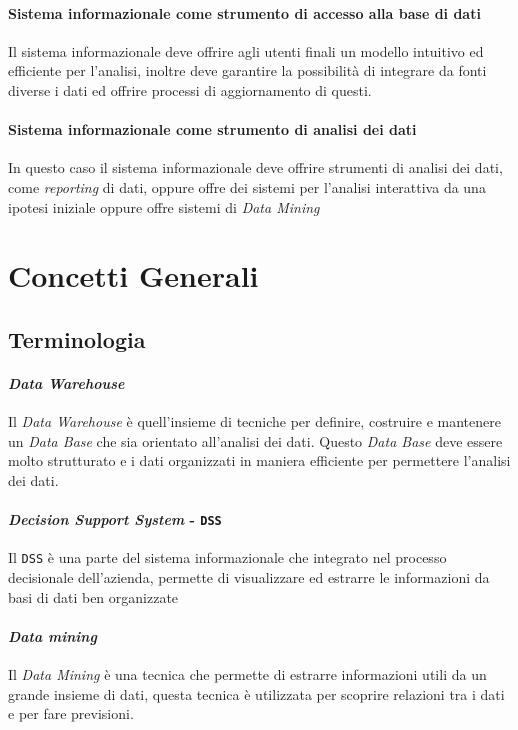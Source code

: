     \paragraph{Sistema informazionale come strumento di accesso alla base di dati} Il sistema informazionale deve offrire agli utenti finali un modello intuitivo ed efficiente per l'analisi, inoltre deve garantire la possibilità di integrare da fonti diverse i dati ed offrire processi di aggiornamento di questi.
    \paragraph{Sistema informazionale come strumento di analisi dei dati} In questo caso il sistema informazionale deve offrire strumenti di analisi dei dati, come \textit{reporting} di dati, oppure offre dei sistemi per l'analisi interattiva da una ipotesi iniziale oppure offre sistemi di \textit{Data Mining}
\section{Concetti Generali}
    \subsection{Terminologia}
        \paragraph{\textit{Data Warehouse}} Il \textit{Data Warehouse} è quell'insieme di tecniche per definire, costruire e mantenere un \textit{Data Base} che sia orientato all'analisi dei dati. Questo \textit{Data Base} deve essere molto strutturato e i dati organizzati in maniera efficiente per permettere l'analisi dei dati.
        \paragraph{\textit{Decision Support System} - \texttt{DSS}} Il \texttt{DSS} è una parte del sistema informazionale che integrato nel processo decisionale dell'azienda, permette di visualizzare ed estrarre le informazioni da basi di dati ben organizzate
        \paragraph{\textit{Data mining}} Il \textit{Data Mining} è una tecnica che permette di estrarre informazioni utili da un grande insieme di dati, questa tecnica è utilizzata per scoprire relazioni tra i dati e per fare previsioni.
